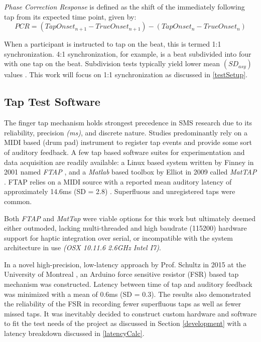 \textit{Phase Correction Response} is defined as the shift of the immediately following tap from its expected time point, given by:
\begin{equation*}
    PCR = (Tap Onset_{n+1} - True Onset_{n+1})-(Tap Onset_{n} - True Onset_{n})
\end{equation*}

When a participant is instructed to tap on the beat, this is termed 1:1 synchronization. 4:1 synchronization, for example, is a beat subdivided into four with one tap on the beat. Subdivision tests typically yield lower mean $(SD_{asy})$ values \cite{repp2013sensorimotor}. This work will focus on 1:1 synchronization as discussed in \ref{testSetup}.

\subsection{Tap Test Software} \label{ttsw}
The finger tap mechanism holds strongest precedence in SMS research due to its reliability, precision \textit{(ms)}, and discrete nature. Studies predominantly rely on a MIDI based (drum pad) instrument to register tap events and provide some sort of auditory feedback. A few tap based software suites for experimentation and data acquisition are readily available: a Linux based system written by Finney in 2001 named \textit{FTAP} \cite{finney2001ftap}, and a \textit{Matlab} based toolbox by Elliot in 2009 called \textit{MatTAP} \cite{elliott2009mattap}. FTAP relies on a MIDI source with a reported mean auditory latency of approximately 14.6ms (SD = 2.8) \cite{schultz2016tap}. Superfluous and unregistered taps were common.

Both \textit{FTAP} and \textit{MatTap} were viable options for this work but ultimately deemed either outmoded, lacking multi-threaded and high baudrate (115200) hardware support for haptic integration over serial, or incompatible with the system architecture in use \textit{(OSX 10.11.6 2.6GHz Intel I7)}.

In a novel high-precision, low-latency approach by Prof. Schultz in 2015 at the University of Montreal \cite{schultz2016tap}, an Arduino force sensitive resistor (FSR) based tap mechanism was constructed. Latency between time of tap and auditory feedback was minimized with a mean of 0.6ms (SD = 0.3). The results also demonstrated the reliability of the FSR in recording fewer superfluous taps as well as fewer missed taps.
It was inevitably decided to construct custom hardware and software to fit the test needs of the project as discussed in Section \ref{development} with a latency breakdown discussed in \ref{latencyCalc}.

